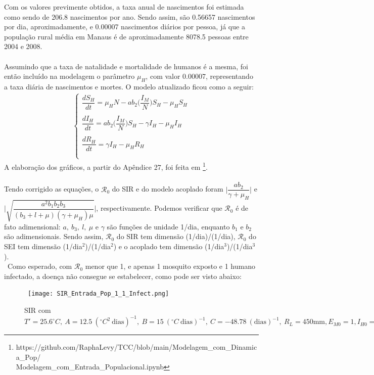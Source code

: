 Com os valores previmente obtidos, a taxa anual de nascimentos foi estimada como sendo de 206.8 
nascimentos por ano. Sendo assim, são 0.56657 nascimentos por dia, aproximadamente, e 0.00007 nascimentos
diários por pessoa, já que a população rural média em Manaus é de aproximadamente 8078.5 pessoas entre 2004 e 2008.
\\\\
Assumindo que a taxa de natalidade e mortalidade de humanos é a mesma, foi então incluído na 
modelagem o parâmetro $\mu_H$, com valor 0.00007, representando a taxa diária de 
nascimentos e mortes. O modelo atualizado ficou como a seguir:
\begin{gather*}
\begin{cases}
\dfrac{dS_H}{dt} = \mu_HN-ab_2\bigg(\dfrac{I_M}{N}\bigg)S_H - \mu_HS_H\\
\\
\dfrac{dI_H}{dt} = ab_2\bigg(\dfrac{I_M}{N}\bigg)S_H-\gamma I_H - \mu_HI_H\\
\\
\dfrac{dR_H}{dt} = \gamma I_H - \mu_HR_H\\
\\
\end{cases}
\end{gather*}
A elaboração dos gráficos, a partir do Apêndice 27, foi feita em \footnote{https://github.com/RaphaLevy/TCC/blob/main/Modelagem\_com\_Dinamica\_Pop/ \\
Modelagem\_com\_Entrada\_Populacional.ipynb}.
\\\\
Tendo corrigido as equações, o $\mathcal{R}_0$ do SIR e do modelo acoplado 
foram $\Big | \dfrac{ab_2}{\gamma + \mu_H}\Big | $ e 
$\Big | \sqrt{\dfrac{a^2b_1b_2b_3}{(b_3+l+\mu)(\gamma+\mu_H)\mu}}\Big | $, respectivamente. Podemos verificar que $\mathcal{R}_0$ é de fato adimensional: $a, \ b_3, \ l, \ \mu$ e $\gamma$ são funções de unidade 1/dia, enquanto $b_1$ e $b_2$ são adimensionais. Sendo assim, $\mathcal{R}_0$ do SIR tem dimensão (1/dia)/(1/dia), $\mathcal{R}_0$ do SEI tem dimensão (1/dia$^2$)/(1/dia$^2$) e o acoplado tem dimensão (1/dia$^3$)/(1/dia$^3$). 
\\\
Como esperado, com $\mathcal{R}_0$ menor que 1, e apenas 1 mosquito exposto e 
1 humano infectado, a doença não consegue se estabelecer, como pode ser visto abaixo:
\begin{figure}[!ht]
        \centering
        \hbox{\hspace{2.5em} \texttt{[image: SIR\_Entrada\_Pop\_1\_1\_Infect.png]}}
        \caption{SIR com $T'=25.6 ^\circ C, \ A=12.5 \ (^\circ C^2 \ \text{dias})^{-1}, \ B=15 \ (^\circ C \ \text{dias})^{-1}, \ C=-48.78 \ (\text{dias})^{-1}, \ R_L=450 \text{mm}, E_{M0}=1, I_{H0}=1$} 
\end{figure} 
